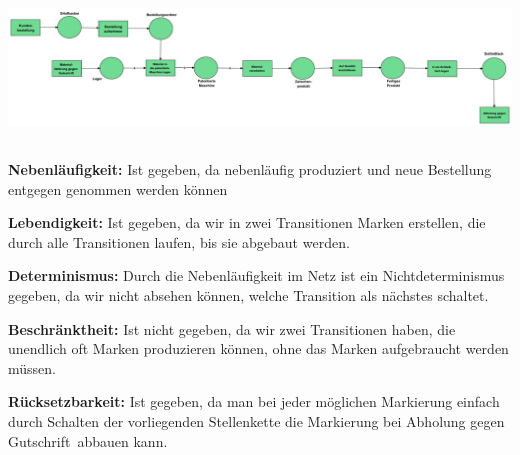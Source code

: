 \documentclass[12pt,a4paper]{../krautsourcing/homework}
\begin{document}
\centerline{
\includegraphics[scale=0.3,trim={0mm 0mm 0mm 0mm},clip]{Aufgabe_7-5/Aufgabe_7-5-4.pdf}
}

\subsection{}
\begin{compactenum}[\bfseries a)]
\item
\textbf{Nebenläufigkeit:} Ist gegeben, da nebenläufig produziert und neue Bestellung entgegen genommen werden können
\item
\textbf{Lebendigkeit:} Ist gegeben, da wir in zwei Transitionen Marken erstellen, die durch alle Transitionen laufen, bis sie abgebaut werden.
\item
\textbf{Determinismus:} Durch die Nebenläufigkeit im Netz ist ein Nichtdeterminismus gegeben, da wir nicht absehen können, welche Transition als nächstes schaltet.
\item
\textbf{Beschränktheit:} Ist nicht gegeben, da wir zwei Transitionen haben, die unendlich oft Marken produzieren können, ohne das Marken aufgebraucht werden müssen.
\item
\textbf{Rücksetzbarkeit:} Ist gegeben, da man bei jeder möglichen Markierung einfach durch Schalten der vorliegenden Stellenkette die Markierung bei \glqq Abholung gegen Gutschrift\grqq \ abbauen kann.
\end{compactenum}

\subsection{}
\end{document}

